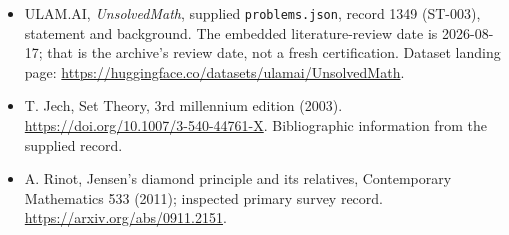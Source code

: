 \documentclass[11pt,a4paper]{article}
\begin{document}
{\small

\begin{itemize}

\item[\hypertarget{source:1349:1}{S1}] ULAM.AI, \emph{UnsolvedMath}, supplied \texttt{problems.json}, record 1349 (ST-003), statement and background. The embedded literature-review date is 2026-08-17; that is the archive’s review date, not a fresh certification. Dataset landing page: \url{https://huggingface.co/datasets/ulamai/UnsolvedMath}.

\item[\hypertarget{source:1349:2}{S2}] T. Jech, Set Theory, 3rd millennium edition (2003). \url{https://doi.org/10.1007/3-540-44761-X}. Bibliographic information from the supplied record.

\item[R1] A. Rinot, Jensen’s diamond principle and its relatives, Contemporary Mathematics 533 (2011); inspected primary survey record.
\url{https://arxiv.org/abs/0911.2151}.
\end{itemize}

}

\label{end:1349}
\end{document}
